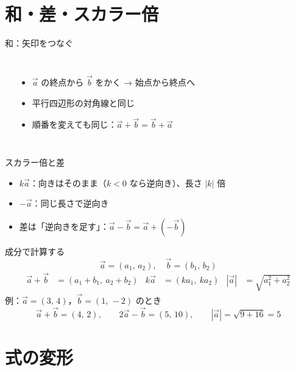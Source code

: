 \documentclass[aspectratio=169]{beamer}
\begin{document}
\section{和・差・スカラー倍}

\begin{frame}{和：矢印をつなぐ}
  \begin{columns}[c]
      \begin{center}
        
      \end{center}
      \begin{itemize}
        \item $\vec{a}$ の終点から $\vec{b}$ をかく → 始点から終点へ
        \item 平行四辺形の対角線と同じ
        \item 順番を変えても同じ：$\vec{a} + \vec{b} = \vec{b} + \vec{a}$
      \end{itemize}
  \end{columns}
\end{frame}

\begin{frame}{スカラー倍と差}
  \begin{center}
    
  \end{center}
  \begin{itemize}
    \item $k\vec{a}$：向きはそのまま（$k<0$ なら逆向き）、長さ $|k|$ 倍
    \item $-\vec{a}$：同じ長さで逆向き
    \item 差は「逆向きを足す」：$\vec{a} - \vec{b} = \vec{a} + (-\vec{b})$
  \end{itemize}
\end{frame}

\begin{frame}{成分で計算する}
  \[
    \vec{a} = (a_1,\, a_2),\quad \vec{b} = (b_1,\, b_2)
  \]
  \begin{align*}
    \vec{a} + \vec{b} &= (a_1 + b_1,\ a_2 + b_2) &
    k\vec{a} &= (k a_1,\ k a_2) &
    |\vec{a}| &= \sqrt{a_1^2 + a_2^2}
  \end{align*}
  \medskip
  例：$\vec{a} = (3,\, 4)$，$\vec{b} = (1,\, -2)$ のとき
  \[
    \vec{a} + \vec{b} = (4,\, 2), \qquad 2\vec{a} - \vec{b} = (5,\, 10), \qquad |\vec{a}| = \sqrt{9 + 16} = 5
  \]
\end{frame}

\section{式の変形}
\end{document}
